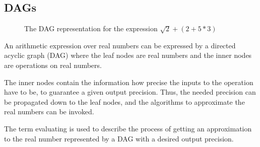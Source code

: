 	\subsection{DAGs}
  \begin{figure}[h]
      \centering
\caption{The DAG representation for the expression $\sqrt 2+(2 + 5*3)$}
    \end{figure}
		An arithmetic expression over real numbers can be expressed by a directed acyclic graph (DAG)
		where the leaf nodes are real numbers and the inner nodes are operations on real numbers.
		
    The inner nodes contain the information how precise the inputs to the
    operation have to be, to guarantee a given output precision.
    Thus, the needed precision can be propagated down to the leaf nodes, and
    the algorithms to approximate the real numbers can be invoked.

	  The term evaluating is used to describe the process of getting an approximation
    to the real number represented by a DAG with a desired output  precision.


